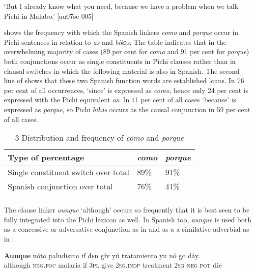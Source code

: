 \glt ‘But I already know what you need, because we have a problem when 
we talk Pichi in Malabo.’ [au07se 005]
\z

 shows the frequency with which the Spanish linkers \textit{como} and \textit{porque} occur in Pichi sentences in relation to \textit{as} and \textit{bikɔs}. The table indicates that in the overwhelming majority of cases (89 per cent for \textit{como} and 91 per cent for \textit{porque}) both conjunctions occur as single constituents in Pichi clauses rather than in clausal switches in which the following material is also in Spanish. The second line of  shows that these two Spanish function words are established loans. In 76 per cent of all occurrences, ‘since’ is expressed as \textit{como}, hence only 24 per cent is expressed with the Pichi equivalent \textit{as}. In 41 per cent of all cases ‘because’ is expressed as \textit{porque}, so Pichi \textit{bikɔs} occurs as the causal conjunction in 59 per cent of all cases.

\begin{table}
\caption{3 Distribution and frequency of \textit{como} and \textit{porque}}
\label{tab:key:13.3}

\begin{tabularx}{\textwidth}{lXX}
\lsptoprule

Type of percentage & \itshape como & \itshape porque\\
\midrule
Single constituent switch over total & 89\% & 91\%\\
Spanish conjunction over total & 76\% & 41\%\\
\lspbottomrule
\end{tabularx}
\end{table}
The clause linker\textit{ aunque} ‘although’ occurs so frequently that it is best seen to be fully integrated into the Pichi lexicon as well. In Spanish too, \textit{aunque} is used both as a concessive or adversative conjunction as in  and as a a similative adverbial as in : 

\ea%
    \label{ex:key:1727}
    \gll \textbf{Aunque}     nóto paludismo if  dɛn  gív  yú tratamiento yu  nó  go  dáy.\\
although    \textsc{neg}.\textsc{foc}  malaria    if  \textsc{3pl}  give  \textsc{2sg.indp}  treatment
\textsc{2sg}  \textsc{neg}  \textsc{pot}  die\\

